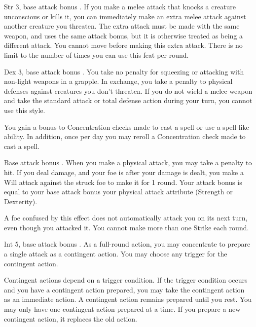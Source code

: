  Str 3, base attack bonus .
 If you make a melee attack that knocks a creature unconscious or kills it, you can immediately make an extra melee attack against another creature you threaten. The extra attack must be made with the same weapon, and uses the same attack bonus, but it is otherwise treated as being a different attack. You cannot move before making this extra attack. There is no limit to the number of times you can use this feat per round.

\featpre Dex 3, base attack bonus .
\featben You take no penalty for squeezing or attacking with non-light weapons in a grapple. In exchange, you take a  penalty to physical defenses against creatures you don't threaten. If you do not wield a melee weapon and take the standard attack or total defense action during your turn, you cannot use this style.

 You gain a  bonus to Concentration checks made to cast a spell or use a spell-like ability. In addition, once per day you may reroll a Concentration check made to cast a spell.

\featpre Base attack bonus .
\featben When you make a physical attack, you may take a  penalty to hit. If you deal damage, and your foe is \bloodied after your damage is dealt, you make a Will attack against the struck foe to make it \confused for 1 round. Your attack bonus is equal to your base attack bonus \add your physical attack attribute (Strength or Dexterity).

A foe confused by this effect does not automatically attack you on its next turn, even though you attacked it. You cannot make more than one Strike each round.

\featpre Int 5, base attack bonus .
\featben As a full-round action, you may concentrate to prepare a single attack as a contingent action. You may choose any trigger for the contingent action.

Contingent actions depend on a trigger condition. If the trigger condition occurs and you have a contingent action prepared, you may take the contingent action as an immediate action. A contingent action remains prepared until you rest. You may only have one contingent action prepared at a time. If you prepare a new contingent action, it replaces the old action.

